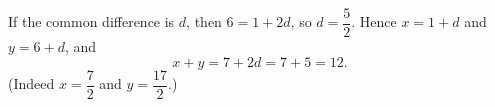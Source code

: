 If the common difference is $d$, then $6=1+2d$, so $d=\dfrac52$. Hence $x=1+d$ and $y=6+d$, and
\[x+y=7+2d=7+5=\boxed{12}.\]
(Indeed $x=\dfrac72$ and $y=\dfrac{17}2$.)
